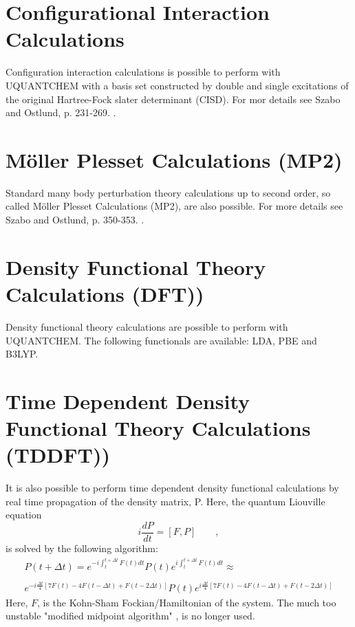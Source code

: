\documentclass[a4paper,twoside,openany]{book}
\begin{document}
\section{Configurational Interaction Calculations}
Configuration interaction calculations is possible to perform with UQUANTCHEM with a basis set constructed by double and single excitations of the original 
Hartree-Fock slater determinant (CISD). For mor details see Szabo and Ostlund, p. 231-269. \cite{Szabo}.

\section{M\"oller Plesset Calculations (MP2)}
Standard many body perturbation theory calculations up to second order, so called M\"oller Plesset Calculations (MP2), are also possible. 
For more details see Szabo and Ostlund, p. 350-353. \cite{Szabo}.

\section{Density Functional Theory Calculations (DFT))}
Density functional theory calculations are possible to perform with UQUANTCHEM. The following functionals are available: LDA, PBE and B3LYP.

\section{Time Dependent Density Functional Theory Calculations (TDDFT))}
It is also possible to perform time dependent density functional calculations by real time propagation of the density matrix, P. Here, the quantum Liouville
equation
\begin{equation}
i\frac{dP}{dt} = [F,P] \qquad,
\end{equation} 
is solved by the following algorithm:
\begin{eqnarray}\label{eq:TDDFT}
P(t+\Delta t ) = e^{-i\int_{t}^{t+\Delta t}F(t)dt }P(t)e^{i\int_{t}^{t+\Delta t}F(t)dt }\approx \qquad \qquad \nonumber \\
 \nonumber \\
e^{-i\frac{\Delta t}{4}[7F(t)-4F(t-\Delta t) + F(t-2\Delta t) ] }P(t)e^{i\frac{\Delta t}{4}[7F(t)-4F(t-\Delta t) + F(t-2\Delta t) ] }
\end{eqnarray}
Here, $F$, is the Kohn-Sham Fockian/Hamiltonian of the system. The much too unstable "modified midpoint algorithm" \cite{midpoint}, is no longer used.
\end{document}
